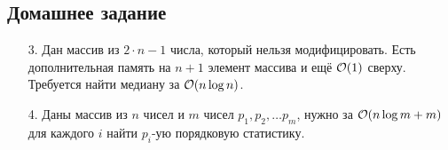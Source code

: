 \subsection{Домашнее задание}
\begin{enumerate}
 







  \item[3.]
    Дан массив из $2 \cdot n - 1$ числа, который нельзя
    модифицировать. Есть дополнительная память на $n + 1$ элемент
    массива и ещё $\mathcal{O}(1)$ сверху. Требуется найти медиану за $\mathcal{O}(n \log n)$.

  \item[4.]
    Даны массив из $n$ чисел и $m$ чисел $p_1, p_2, \dots p_m$, нужно за
    $\mathcal{O}(n \log m + m)$ для каждого $i$ найти $p_i$-ую порядковую статистику.


\end{enumerate}

